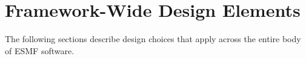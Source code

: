 \section{Framework-Wide Design Elements}
\label{sec:fwdesign}

The following sections describe design choices that apply across the 
entire body of ESMF software.








